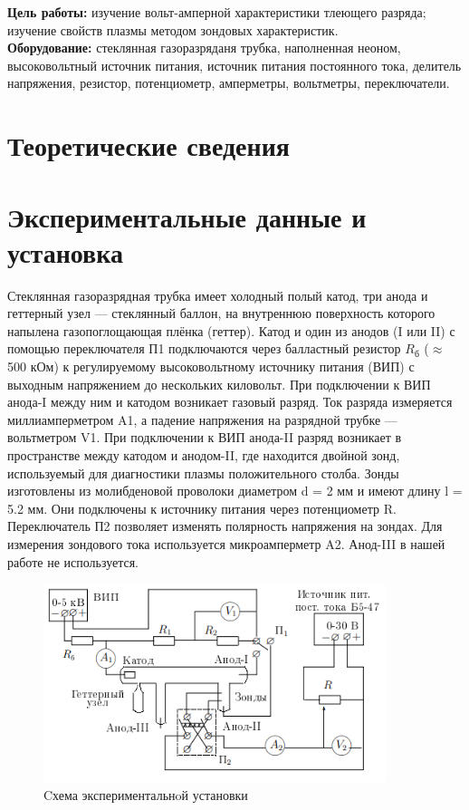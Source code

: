 \textbf{Цель работы:} изучение вольт-амперной характеристики тлеющего разряда; изучение свойств плазмы методом зондовых характеристик.\\\indent
\textbf{Оборудование:} стеклянная газоразряданя трубка, наполненная неоном, высоковольтный источник питания, источник питания постоянного тока, делитель напряжения, резистор, потенциометр, амперметры, вольтметры, переключатели.

\section*{Теоретические сведения}

\section*{Экспериментальные данные и установка}
\indent Стеклянная газоразрядная трубка имеет холодный полый катод, три анода и геттерный узел — стеклянный баллон, на внутреннюю поверхность которого напылена газопоглощающая плёнка (геттер).
\noindent Катод и один из анодов (I или II) с помощью переключателя П1 подключаются через балластный резистор $R_{\text{б}}$ ($\approx$ 500 кОм) к регулируемому высоковольтному источнику питания (ВИП) с выходным напряжением до нескольких киловольт.
\indent При подключении к ВИП анода-I между ним и катодом возникает газовый разряд.
Ток разряда измеряется миллиамперметром A1, а падение напряжения на разрядной трубке — вольтметром V1.
При подключении к ВИП анода-II разряд возникает в пространстве
между катодом и анодом-II, где находится двойной зонд, используемый для диагностики плазмы положительного столба.
Зонды изготовлены
из молибденовой проволоки диаметром d = 2  мм и имеют длину l = 5.2 мм. Они подключены к источнику питания через потенциометр R. Переключатель П2 позволяет изменять полярность напряжения на зондах.
Для измерения зондового тока используется
микроамперметр A2. Анод-III в нашей работе не используется.
\begin{figure}[h!]
    \centering
    \includegraphics[width=10cm]{setup.png}
    \caption{Cхема экспериментальнoй установки}
\end{figure}
\newpage
